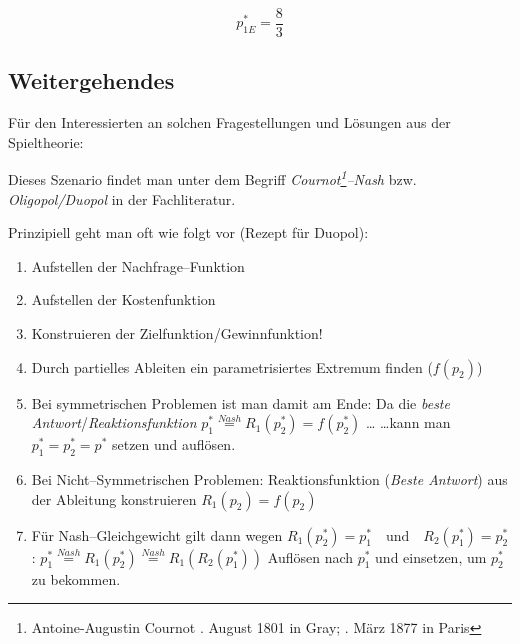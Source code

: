 \documentclass[paper=a4,notitlepage,parskip=half,plainheadsepline]{scrartcl}
\begin{document}
$$p^*_{1E} = \frac{8}{3}$$

\subsection{Weitergehendes}
Für den Interessierten an solchen Fragestellungen und Lösungen aus der Spieltheorie:

Dieses Szenario findet man unter dem Begriff \emph{Cournot\footnote{Antoine-Augustin Cournot . August 1801 in Gray; . März 1877 in Paris}--Nash} bzw. \emph{Oligopol/Duopol} in der Fachliteratur.

Prinzipiell geht man oft wie folgt vor (Rezept für Duopol):

\begin{enumerate}
\item Aufstellen der Nachfrage--Funktion
\item Aufstellen der Kostenfunktion
\item Konstruieren der Zielfunktion/Gewinnfunktion!
\item Durch partielles Ableiten ein parametrisiertes Extremum finden ($f(p_2)$)
\item Bei symmetrischen Problemen ist man damit am Ende:
\subitem Da die \emph{beste Antwort}/\emph{Reaktionsfunktion}  $p^*_1\stackrel{Nash}{=}R_1(p^*_2)= f(p^*_2)$ \ldots
\subitem \ldots kann man $p^*_1=p^*_2=p^*$ setzen und auflösen.
\item Bei Nicht--Symmetrischen Problemen:
\subitem Reaktionsfunktion (\emph{Beste Antwort}) aus der Ableitung konstruieren $R_1(p_2)= f(p_2)$
\item Für Nash--Gleichgewicht gilt dann wegen $R_1(p^*_2) = p^*_1 \quad\text{und}\quad R_2(p^*_1) = p^*_2$:
\subitem $p^*_1 \stackrel{Nash}{=} R_1(p^*_2) \stackrel{Nash}{=} R_1(R_2(p^*_1))$
\subitem Auflösen nach $p^*_1$ und einsetzen, um $p^*_2$ zu bekommen. 
\end{enumerate}

\newpage
\end{document}
